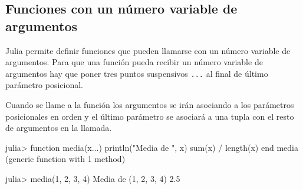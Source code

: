 \documentclass[
  letterpaper,
  DIV=11,
  numbers=noendperiod]{scrreprt}
\newenvironment{Shaded}{\begin{snugshade}}{\end{snugshade}}
\newcommand{\FloatTok}[1]{\textcolor[rgb]{0.68,0.00,0.00}{#1}}
\newcommand{\FunctionTok}[1]{\textcolor[rgb]{0.28,0.35,0.67}{#1}}
\newcommand{\KeywordTok}[1]{\textcolor[rgb]{0.00,0.23,0.31}{#1}}
\newcommand{\NormalTok}[1]{\textcolor[rgb]{0.00,0.23,0.31}{#1}}
\newcommand{\OperatorTok}[1]{\textcolor[rgb]{0.37,0.37,0.37}{#1}}
\newcommand{\SpecialCharTok}[1]{\textcolor[rgb]{0.37,0.37,0.37}{#1}}
\newcommand{\StringTok}[1]{\textcolor[rgb]{0.13,0.47,0.30}{#1}}
\begin{document}
\begin{Shaded}
\end{Shaded}

\hypertarget{funciones-con-un-nuxfamero-variable-de-argumentos}{%
\subsection{Funciones con un número variable de
argumentos}\label{funciones-con-un-nuxfamero-variable-de-argumentos}}

Julia permite definir funciones que pueden llamarse con un número
variable de argumentos. Para que una función pueda recibir un número
variable de argumentos hay que poner tres puntos suspensivos
\texttt{...} al final de último parámetro posicional.

Cuando se llame a la función los argumentos se irán asociando a los
parámetros posicionales en orden y el último parámetro se asociará a una
tupla con el resto de argumentos en la llamada.

\begin{Shaded}
\begin{Highlighting}[]
\NormalTok{julia}\OperatorTok{\textgreater{}} \KeywordTok{function} \FunctionTok{media}\NormalTok{(x}\OperatorTok{...}\NormalTok{)}
       \FunctionTok{println}\NormalTok{(}\StringTok{"Media de "}\NormalTok{, x)}
       \FunctionTok{sum}\NormalTok{(x) }\OperatorTok{/} \FunctionTok{length}\NormalTok{(x)}
       \KeywordTok{end}
\NormalTok{media (generic }\KeywordTok{function}\NormalTok{ with }\FloatTok{1}\NormalTok{ method)}

\NormalTok{julia}\OperatorTok{\textgreater{}} \FunctionTok{media}\NormalTok{(}\FloatTok{1}\NormalTok{, }\FloatTok{2}\NormalTok{, }\FloatTok{3}\NormalTok{, }\FloatTok{4}\NormalTok{)}
\NormalTok{Media de (}\FloatTok{1}\NormalTok{, }\FloatTok{2}\NormalTok{, }\FloatTok{3}\NormalTok{, }\FloatTok{4}\NormalTok{)}
\FloatTok{2.5}
\end{Highlighting}
\end{Shaded}
\end{document}
